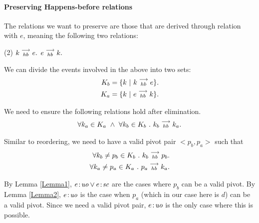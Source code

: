 \paragraph{Preserving Happens-before relations}
        
    The relations we want to preserve are those that are derived through relation with $e$, meaning the following two relations:
    \begin{tasks}(2)
        \task $k\stackrel{\longrightarrow}{_{hb}}e.$
        \task $e\stackrel{\longrightarrow}{_{hb}}k.$
    \end{tasks}

    We can divide the events involved in the above into two sets:
    \begin{align*}
        K_b = \{k \ | \ k\stackrel{\longrightarrow}{_{hb}}e \}. \\
        K_a = \{k \ | \ e\stackrel{\longrightarrow}{_{hb}}k \}. 
    \end{align*}
   
    We need to ensure the following relations hold after elimination.
    \begin{align}
        \forall k_a \in K_a \ \wedge \ \forall k_b \in K_b \ . \ \reln{k_b}{hb}{k_a}.
    \end{align}
    
    Similar to reordering, we need to have a valid pivot pair $<p_b, p_a>$ such that 
    \begin{align}
        \forall k_b \neq p_b \in K_b \ . \ k_b\stackrel{\longrightarrow}{_{hb}}p_b. \\
        \forall k_a \neq p_a \in K_a \ . \ p_a\stackrel{\longrightarrow}{_{hb}}k_a. 
    \end{align}

    By Lemma \ref{Lemma1}, $e\!:\!\textit{uo} \vee e\!:\!\textit{sc}$ are the cases where $p_b$ can be a valid pivot. 
    By Lemma \ref{Lemma2}, $e\!:\!\textit{uo}$ is the case when $p_a$ (which in our case here is $d$) can be a valid pivot. 
    Since we need a valid pivot pair, $e\!:\!\textit{uo}$ is the only case where this is possible. 